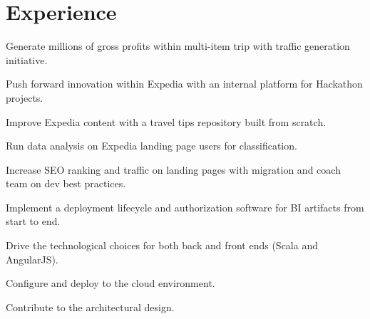 \documentclass[letterpaper]{deedy-resume} %
\begin{document}
\begin{minipage}[t]{0.66\textwidth} %


\section{Experience}


\vspace{\topsep} %
\begin{tightitemize}
\item Generate millions of gross profits within multi-item trip with traffic generation initiative.
\item Push forward innovation within Expedia with an internal platform for Hackathon projects.
\item Improve Expedia content with a travel tips repository built from scratch.
\item Run data analysis on Expedia landing page users for classification.
\item Increase SEO ranking and traffic on landing pages with migration and coach team on dev best practices.
\end{tightitemize}

\sectionspace %


\begin{tightitemize}
\item Implement a deployment lifecycle and authorization software for BI artifacts from start to end.
\item Drive the technological choices for both back and front ends (Scala and AngularJS).
\item Configure and deploy to the cloud environment.
\item Contribute to the architectural design.
\end{tightitemize}

\sectionspace %



\end{minipage}
\end{document}
